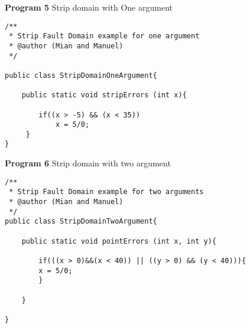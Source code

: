 \textbf{Program 5} Strip domain with One argument
\begin{lstlisting}
/**
 * Strip Fault Domain example for one argument
 * @author (Mian and Manuel)
 */

public class StripDomainOneArgument{

	public static void stripErrors (int x){
	
		if((x > -5) && (x < 35))
			x = 5/0;
  	 }
}
\end{lstlisting}
\textbf{Program 6} Strip domain with two argument
\begin{lstlisting}
/**
 * Strip Fault Domain example for two arguments
 * @author (Mian and Manuel)
 */
public class StripDomainTwoArgument{

	public static void pointErrors (int x, int y){

		if(((x > 0)&&(x < 40)) || ((y > 0) && (y < 40))){
		x = 5/0;
		}
  	
	}

}

\end{lstlisting}
